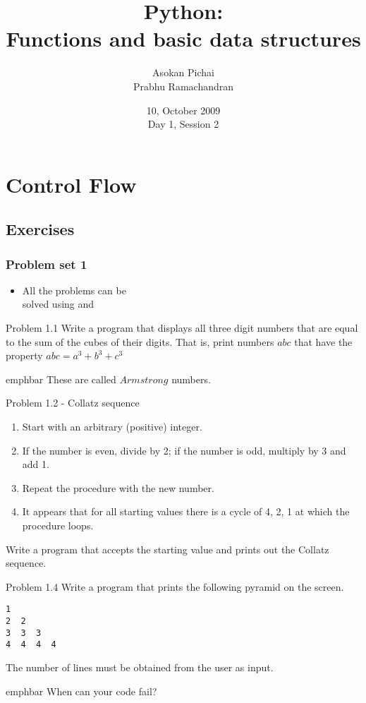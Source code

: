 \documentclass[14pt,compress]{beamer}
\title[Basic Python]{Python:\\Functions and basic data structures}
\author[FOSSEE Team] {Asokan Pichai\\Prabhu Ramachandran}
\institute[IIT Bombay] {Department of Aerospace Engineering\\IIT Bombay}
\date[] {10, October 2009\\Day 1, Session 2}
\newcommand{\emphbar}[1]
{\begin{beamercolorbox}[rounded=true]{emphbar} 
      {#1}
 \end{beamercolorbox}
}
\newcounter{time}
\newcommand{\inctime}[1]{\addtocounter{time}{#1}{\tiny \thetime\ m}}
\newcommand{\kwrd}[1]{ \texttt{\textbf{\color{blue}{#1}}}  }
\begin{document}
\begin{frame}
  \titlepage
\end{frame}

\section{Control Flow}

\subsection{Exercises}
\begin{frame}
  \frametitle{Problem set 1}
  \begin{itemize}
    \item All the problems can be\\
      solved using \kwrd{if} and \kwrd{while} 
  \end{itemize}
\end{frame}

\begin{frame}{Problem 1.1}
  Write a program that displays all three digit numbers that are equal to the sum of the cubes of their digits. That is, print numbers $abc$ that have the property $abc = a^3 + b^3 + c^3$\\
\vspace*{0.2in}
\emphbar{These are called $Armstrong$ numbers.}
\end{frame}
  
\begin{frame}{Problem 1.2 - Collatz sequence}
\begin{enumerate}
  \item Start with an arbitrary (positive) integer. 
  \item If the number is even, divide by 2; if the number is odd, multiply by 3 and add 1.
  \item Repeat the procedure with the new number.
  \item It appears that for all starting values there is a cycle of 4, 2, 1 at which the procedure loops.
\end{enumerate}
    Write a program that accepts the starting value and prints out the Collatz sequence.

\end{frame}

\begin{frame}[fragile]{Problem 1.4}
  Write a program that prints the following pyramid on the screen. 
  \begin{lstlisting}
1
2  2
3  3  3
4  4  4  4
  \end{lstlisting}
The number of lines must be obtained from the user as input.\\
\pause
\emphbar{When can your code fail?}
\only<2->{\inctime{20}}
\end{frame}
\end{document}
